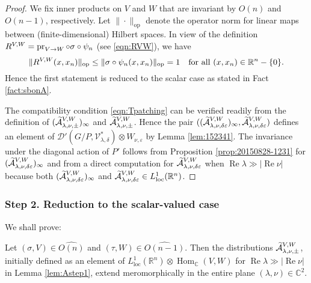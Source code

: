 \begin{proof}
We fix inner products on $V$ and $W$
 that are invariant by $O(n)$ and $O(n-1)$, 
 respectively.  
Let $\| \cdot \|_{\operatorname{op}}$
 denote the operator norm
 for linear maps 
 between (finite-dimensional) Hilbert spaces.  
In view of the definition $R^{{V},{W}} = \operatorname{pr}_{{V}\to{W}} \circ \sigma \circ \psi_n$
 (see \eqref{eqn:RVW}), 
 we have
\[
   \| R^{{V},{W}}(x,x_n)  \|_{\operatorname{op}}
  \le
  \| \sigma \circ \psi_n (x,x_n) \|_{\operatorname{op}}
  = 1
\quad
  \text{for all }
  (x,x_n) \in {\mathbb{R}}^n - \{0\}.  
\]
Hence the first statement is reduced to the scalar case
 as stated in Fact \ref{fact:sbonA}.  



The compatibility condition \eqref{eqn:Tpatching}
 can be verified readily from the definition
 of $(\widetilde{{\mathcal{A}}}_{{\lambda},{\nu},{\pm}}^{{V,W}})_{\infty}$
 and $\widetilde{{\mathcal{A}}}_{{\lambda},{\nu},{\pm}}^{{V,W}}$.  
Hence the pair
$
   ((\widetilde{{\mathcal{A}}}_{{\lambda},{\nu},{\delta\varepsilon}}^{{V,W}})_{\infty}, 
   \widetilde{{\mathcal{A}}}_{{\lambda},{\nu},{\delta\varepsilon}}^{{V,W}})
$
 defines an element of 
 ${\mathcal{D}}'(G/P, {\mathcal{V}}_{\lambda,\delta}^{\ast}) \otimes W_{\nu, \varepsilon}$
 by Lemma \ref{lem:152341}.  
The invariance under the diagonal action of $P'$
 follows from Proposition \ref{prop:20150828-1231}
 for $(\widetilde{{\mathcal{A}}}_{{\lambda},{\nu},{\delta\varepsilon}}^{{V,W}})_{\infty}$
 and from a direct computation 
 for $\widetilde{{\mathcal{A}}}_{{\lambda},{\nu},{\delta\varepsilon}}^{{V,W}}$
 when $\operatorname{Re} \lambda \gg |\operatorname{Re}\nu|$
 because 
both $(\widetilde{{\mathcal{A}}}_{{\lambda},{\nu},{\delta\varepsilon}}^{{V,W}})_{\infty}$
 and $\widetilde{{\mathcal{A}}}_{{\lambda},{\nu},{\delta\varepsilon}}^{{V,W}} \in L_{\operatorname{loc}}^1({\mathbb{R}}^n)$.  
\end{proof}



\subsubsection{Step 2. Reduction to the scalar-valued case}
We shall prove:
\begin{proposition}
\label{prop:20151209}
Let $(\sigma,V) \in\widehat{O(n)}$
 and $(\tau,W) \in\widehat{O(n-1)}$.  
Then the distributions  
$\widetilde{{\mathcal{A}}}_{{\lambda},{\nu},{\pm}}^{{V,W}}$, 
 initially defined
 as an element of $L_{\operatorname{loc}}^1({\mathbb{R}}^n) \otimes \operatorname{Hom}_{\mathbb{C}}(V,W)$
 for $\operatorname{Re} \lambda \gg |\operatorname{Re} \nu|$
 in Lemma \ref{lem:Astep1}, 
 extend meromorphically 
 in the entire plane $(\lambda,\nu) \in {\mathbb{C}}^2$.  
\end{proposition}

